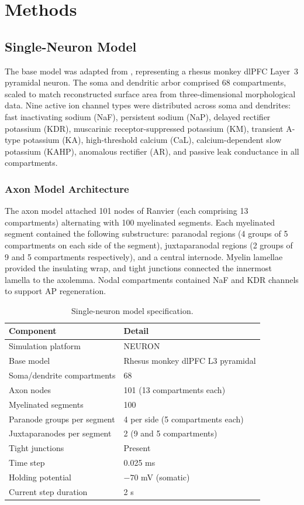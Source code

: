 \documentclass[11pt]{article}
\begin{document}
\section{Methods}

\subsection{Single-Neuron Model}

The base model was adapted from \citet{rumbell2016}, representing a rhesus monkey dlPFC Layer~3 pyramidal neuron. The soma and dendritic arbor comprised 68 compartments, scaled to match reconstructed surface area from three-dimensional morphological data. Nine active ion channel types were distributed across soma and dendrites: fast inactivating sodium (NaF), persistent sodium (NaP), delayed rectifier potassium (KDR), muscarinic receptor-suppressed potassium (KM), transient A-type potassium (KA), high-threshold calcium (CaL), calcium-dependent slow potassium (KAHP), anomalous rectifier (AR), and passive leak conductance in all compartments.

\subsubsection{Axon Model Architecture}

The axon model attached 101 nodes of Ranvier (each comprising 13 compartments) alternating with 100 myelinated segments. Each myelinated segment contained the following substructure: paranodal regions (4 groups of 5 compartments on each side of the segment), juxtaparanodal regions (2 groups of 9 and 5 compartments respectively), and a central internode. Myelin lamellae provided the insulating wrap, and tight junctions connected the innermost lamella to the axolemma. Nodal compartments contained NaF and KDR channels to support AP regeneration.

\begin{table}[ht]
\centering
\caption{Single-neuron model specification.}
\label{tab:model_spec}
\begin{tabular}{ll}
\toprule
Component & Detail \\
\midrule
Simulation platform & NEURON \\
Base model & Rhesus monkey dlPFC L3 pyramidal \\
Soma/dendrite compartments & 68 \\
Axon nodes & 101 (13 compartments each) \\
Myelinated segments & 100 \\
Paranode groups per segment & 4 per side (5 compartments each) \\
Juxtaparanodes per segment & 2 (9 and 5 compartments) \\
Tight junctions & Present \\
Time step & 0.025 ms \\
Holding potential & $-70$ mV (somatic) \\
Current step duration & 2 s \\
\bottomrule
\end{tabular}
\end{table}
\end{document}
